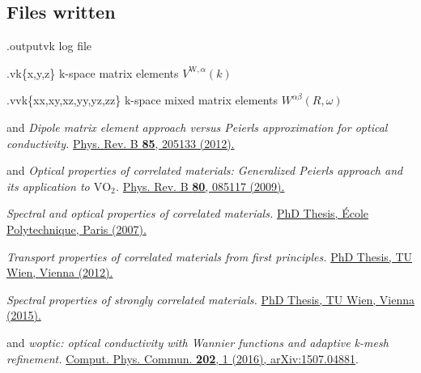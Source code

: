 \subsection{Files written}
\begin{options}
\item[\case.outputvk] log file
\item[\case.vk\{x,y,z\}] k-space matrix elements $V^{\text{W},α}(k)$
\item[\case.vvk\{xx,xy,xz,yy,yz,zz\}] k-space mixed matrix elements
  $W^{αβ}(R, ω)$ 
\end{options}


\backmatter
\begin{thebibliography}{88}
   and 
  \textit{Dipole matrix element approach versus Peierls approximation
    for optical conductivity.}
  \href{http://prb.aps.org/abstract/PRB/v85/i20/e205133}{
    Phys. Rev. B {\bf 85}, 205133 (2012).
  }

   and 
  \textit{Optical properties of correlated materials: Generalized
    Peierls approach and its application to $\text{VO}_{2}$.}
  \href{http://prb.aps.org/abstract/PRB/v80/i8/e085117}{
    Phys. Rev. B {\bf 80}, 085117 (2009).
  }

  \textit{Spectral and optical properties of correlated materials.}
  \href{https://pastel.archives-ouvertes.fr/pastel-00003163}{
    PhD Thesis, \'Ecole Polytechnique, Paris (2007).
  }

  \textit{Transport properties of correlated materials from first
    principles.}
  \href{http://katalog.ub.tuwien.ac.at/AC07812647}{
    PhD Thesis, TU Wien, Vienna (2012).
  }

  \textit{Spectral properties of strongly correlated materials.}
  \href{http://katalog.ub.tuwien.ac.at/AC12656725}{
    PhD Thesis, TU Wien, Vienna (2015).
  }

   and
  \textit{woptic: optical conductivity with Wannier functions and adaptive
    k-mesh refinement.}
  \href{http://www.sciencedirect.com/science/article/pii/S0010465515004488}{
    Comput. Phys. Commun. \textbf{202}, 1 (2016),
  }
  \href{http://arxiv.org/abs/1507.04881}{arXiv:1507.04881}.


\end{thebibliography}
